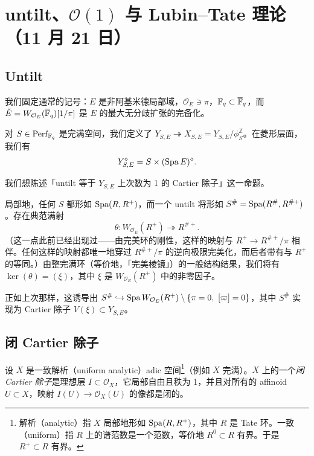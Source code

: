 \section[untilt、$\mathcal{O}(1)$ 与 Lubin--Tate 理论]{untilt、$\mathcal{O}(1)$ 与 Lubin--Tate 理论（11 月 21 日）}


\subsection{Untilt}

我们固定通常的记号：$E$ 是非阿基米德局部域，$\mathcal O_E \ni \pi$，$\mathbb{F}_q \subset \overline{\mathbb{F}}_q$，而
$\breve{E} = W_{\mathcal O_E}(\overline{\mathbb{F}}_q)[1/\pi]$ 是 $E$ 的最大无分歧扩张的完备化。

对 $S \in \mathrm{Perf}_{\mathbb{F}_q}$ 是完满空间，我们定义了 $Y_{S,E} \twoheadrightarrow X_{S,E} = Y_{S,E}/\phi_S^{\mathbb Z}$。在菱形层面，我们有
\[
  Y_{S,E}^{\diamond} = S \times (\operatorname{Spa} E)^{\diamond}.
\]

我们想陈述「untilt 等于 $Y_{S,E}$ 上次数为 1 的 Cartier 除子」这一命题。

局部地，任何 $S$ 都形如 $\operatorname{Spa}(R,R^+)$，而一个 untilt 将形如 $S^{\#} = \operatorname{Spa}(R^{\#},R^{\#+})$。存在典范满射
\[
  \theta: W_{\mathcal O_E}(R^+) \twoheadrightarrow R^{\#+}.
\]
（这一点此前已经出现过——由完美环的刚性，这样的映射与 $R^+ \to R^{\#+}/\pi$ 相伴。任何这样的映射都唯一地穿过 $R^{\#+}/\pi$ 的逆向极限完美化，而后者带有与 $R^+$ 的等同。）由整完满环（等价地，「完美棱镜」）的一般结构结果，我们将有 $\ker(\theta) = (\xi)$，其中 $\xi$ 是 $W_{\mathcal O_E}(R^+)$ 中的非零因子。

正如上次那样，这诱导出 $S^{\#} \hookrightarrow \Spa W_{\mathcal O_E}(R^+) \setminus \{\pi = 0,\ [\varpi] = 0\}$，其中 $S^{\#}$ 实现为 Cartier 除子 $V(\xi) \subset Y_{S,E}$。

\subsection{闭 Cartier 除子}

\begin{definition}
设 $X$ 是一致解析（uniform analytic）adic 空间\footnote{解析（analytic）指 $X$ 局部地形如 $\operatorname{Spa}(R,R^+)$，其中 $R$ 是 Tate 环。一致（uniform）指 $R$ 上的谱范数是一个范数，等价地 $R^0 \subset R$ 有界。于是 $R^+ \subset R$ 有界。}（例如 $X$ 完满）。$X$ 上的一个\emph{闭 Cartier 除子}是理想层 $I \subset \mathcal O_X$，它局部自由且秩为 1，并且对所有的 affinoid $U \subset X$，映射 $I(U) \to \mathcal O_X(U)$ 的像都是闭的。
\end{definition}

